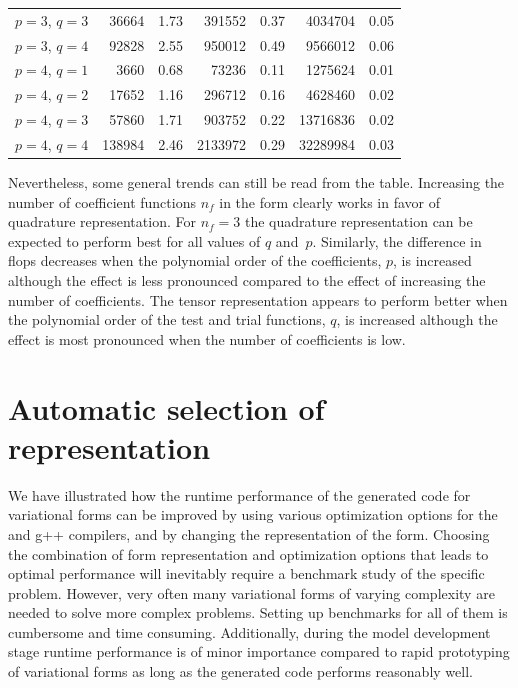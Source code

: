 \begin{table}
\begin{center}
\begin{tabular}{l|rr|rr|rr}
$p = 3$, $q = 3$  &  36664  &  1.73               &  391552 &  0.37               & 4034704 & 0.05\\
$p = 3$, $q = 4$  &  92828  &  2.55               &  950012 &  0.49               & 9566012 & 0.06\\
\hline
$p = 4$, $q = 1$  &   3660  &  0.68               &   73236 &  0.11               & 1275624 & 0.01\\
$p = 4$, $q = 2$  &  17652  &  1.16               &  296712 &  0.16               & 4628460 & 0.02\\
$p = 4$, $q = 3$  &  57860  &  1.71               &  903752 &  0.22               &13716836 & 0.02\\
$p = 4$, $q = 4$  & 138984  &  2.46               & 2133972 &  0.29               &32289984 & 0.03
\end{tabular}
\end{center}
\end{table}
%
Nevertheless, some general trends can still be read from the table.
Increasing the number of coefficient functions $n_f$ in the form
clearly works in favor of quadrature representation.  For $n_{f}=3$
the quadrature representation can be expected to perform best for all
values of $q$ and~$p$.  Similarly, the difference in flops decreases when
the polynomial order of the coefficients, $p$, is increased although
the effect is less pronounced compared to the effect of increasing the
number of coefficients.  The tensor representation appears to perform
better when the polynomial order of the test and trial functions, $q$,
is increased although the effect is most pronounced when the number of
coefficients is low.
\section{Automatic selection of representation}

We have illustrated how the runtime performance of the generated code for
variational forms can be improved by using various optimization options
for the \ffc{} and g++ compilers, and by changing the representation
of the form.  Choosing the combination of form representation and
optimization options that leads to optimal performance will inevitably
require a benchmark study of the specific problem.  However, very often
many variational forms of varying complexity are needed to solve more
complex problems. Setting up benchmarks for all of them is cumbersome and
time consuming.  Additionally, during the model development stage runtime
performance is of minor importance compared to rapid prototyping of
variational forms as long as the generated code performs reasonably well.

